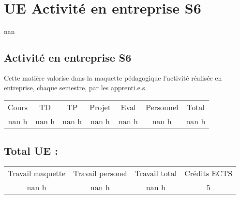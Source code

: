 \section{UE Activité en entreprise S6}%
\label{sec:UEActivitenentrepriseS6}%
nan%
\subsection{Activité en entreprise S6}%
\label{subsec:ActivitenentrepriseS6}%

%
Cette matière valorise dans la maquette pédagogique l'activité réalisée en entreprise, chaque semestre, par les apprenti.e.s.%
\begin{longtable}{c c c c c c c}%
\hline%
Cours&TD&TP&Projet&Eval&Personnel&Total\\%
nan h&nan h&nan h&nan h&nan h&nan h&nan h\\%
\hline%
\end{longtable}%
\subsection{Total UE :}%
\label{subsec:TotalUE}%

%
\begin{longtable}{c c c c}%
\hline%
Travail maquette&Travail personel&Travail total&Crédits ECTS\\%
nan h&nan h&nan h&5\\%
\hline%
\end{longtable}